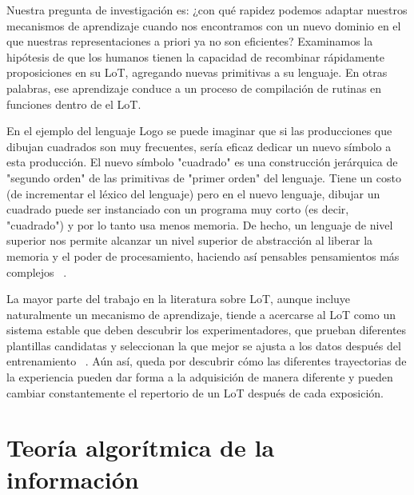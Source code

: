 Nuestra pregunta de investigación es: ¿con qué rapidez podemos adaptar nuestros mecanismos de aprendizaje cuando nos encontramos con un nuevo dominio en el que nuestras representaciones a priori ya no son eficientes? Examinamos la hipótesis de que los humanos tienen la capacidad de recombinar rápidamente proposiciones en su LoT, agregando nuevas primitivas a su lenguaje. En otras palabras, ese aprendizaje conduce a un proceso de compilación de rutinas en funciones dentro de el LoT.

En el ejemplo del lenguaje Logo se puede imaginar que si las producciones que dibujan cuadrados son muy frecuentes, sería eficaz dedicar un nuevo símbolo a esta producción. El nuevo símbolo "cuadrado" es una construcción jerárquica de "segundo orden" de las primitivas de "primer orden" del lenguaje. Tiene un costo (de incrementar el léxico del lenguaje) pero en el nuevo lenguaje, dibujar un cuadrado puede ser instanciado con un programa muy corto (es decir, "cuadrado") y por lo tanto usa menos memoria. De hecho, un lenguaje de nivel superior nos permite alcanzar un nivel superior de abstracción al liberar la memoria y el poder de procesamiento, haciendo así pensables pensamientos más complejos ~\cite{minsky1967computation, murphy1988comprehending}.

La mayor parte del trabajo en la literatura sobre LoT, aunque incluye naturalmente un mecanismo de aprendizaje, tiende a acercarse al LoT como un sistema estable que deben descubrir los experimentadores, que prueban diferentes plantillas candidatas y seleccionan la que mejor se ajusta a los datos después del entrenamiento ~\cite{goodman2008rational, kemp2012exploring, piantadosi2016logical}. Aún así, queda por descubrir cómo las diferentes trayectorias de la experiencia pueden dar forma a la adquisición de manera diferente y pueden cambiar constantemente el repertorio de un LoT después de cada exposición.


\section{Teoría algorítmica de la información}


